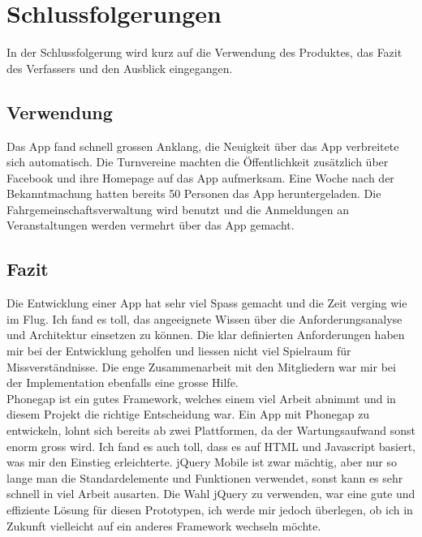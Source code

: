 %
%

\chapter{Schlussfolgerungen}\label{chap.Schlussfolgerungen}
In der Schlussfolgerung wird kurz auf die Verwendung des Produktes, das Fazit des Verfassers und den Ausblick eingegangen.

\section{Verwendung}\label{fazit_verwendung}
Das App fand schnell grossen Anklang, die Neuigkeit über das App verbreitete sich automatisch. Die Turnvereine machten die Öffentlichkeit zusätzlich über Facebook und ihre Homepage auf das App aufmerksam. Eine Woche nach der Bekanntmachung hatten bereits 50 Personen das App heruntergeladen. Die Fahrgemeinschaftsverwaltung wird benutzt und die Anmeldungen an Veranstaltungen werden vermehrt über das App gemacht.

\section{Fazit}\label{fazit}

Die Entwicklung einer App hat sehr viel Spass gemacht und die Zeit verging wie im Flug. Ich fand es toll, das angeeignete Wissen über die Anforderungsanalyse und Architektur einsetzen zu können. Die klar definierten Anforderungen haben mir bei der Entwicklung geholfen und liessen nicht viel Spielraum für Missverständnisse. Die enge Zusammenarbeit mit den Mitgliedern war mir bei der Implementation ebenfalls eine grosse Hilfe.\\

Phonegap ist ein gutes Framework, welches einem viel Arbeit abnimmt und in diesem Projekt die richtige Entscheidung war. Ein App mit Phonegap zu entwickeln, lohnt sich bereits ab zwei Plattformen, da der Wartungsaufwand sonst enorm gross wird. Ich fand es auch toll, dass es auf HTML und Javascript basiert, was mir den Einstieg erleichterte. jQuery Mobile ist zwar mächtig, aber nur so lange man die Standardelemente und Funktionen verwendet, sonst kann es sehr schnell in viel Arbeit ausarten. Die Wahl jQuery zu verwenden, war eine gute und effiziente Lösung für diesen Prototypen, ich werde mir jedoch überlegen, ob ich in Zukunft vielleicht auf ein anderes Framework wechseln möchte.\\

